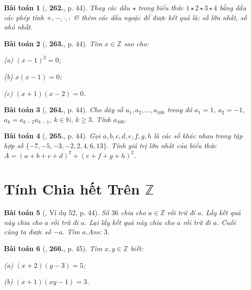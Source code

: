 \documentclass{article}
\numberwithin{equation}{section}
\newtheorem{baitoan}{Bài toán}
\begin{document}
\begin{baitoan}[\cite{Binh_Toan_6_tap_1}, \textbf{262.}, p. 44]
	Thay các dấu  $\star$ trong biểu thức $1\star2\star3\star4$ bằng dấu các phép tính $+,-,\cdot,:$ \& thêm các dấu ngoặc để được kết quả là: số lớn nhất, số nhỏ nhất.
\end{baitoan}

\begin{baitoan}[\cite{Binh_Toan_6_tap_1}, \textbf{263.}, p. 44]
	Tìm $x\in\mathbb{Z}$ sao cho:
	\begin{enumerate*}
		\item[(a)] $(x - 1)^2 = 0$;
		\item[(b)] $x(x - 1) = 0$;
		\item[(c)] $(x + 1)(x - 2) = 0$.
	\end{enumerate*}
\end{baitoan}

\begin{baitoan}[\cite{Binh_Toan_6_tap_1}, \textbf{264.}, p. 44]
	Cho dãy số $a_1,a_2,\ldots,a_{100}$ trong đó $a_1 = 1$, $a_2 = -1$, $a_k = a_{k-2}a_{k-1}$, $k\in\mathbb{N}$, $k\ge 3$. Tính $a_{100}$.
\end{baitoan}

\begin{baitoan}[\cite{Binh_Toan_6_tap_1}, \textbf{265.}, p. 44]
	Gọi $a,b,c,d,e,f,g,h$ là các số khác nhau trong tập hợp số $\{-7,-5,-3,-2,2,4,6,13\}$. Tính giá trị lớn nhất của biểu thức $A = (a + b + c + d)^2 + (e + f + g + h)^2$.
\end{baitoan}


\section{Tính Chia hết Trên $\mathbb{Z}$}

\begin{baitoan}[\cite{Binh_Toan_6_tap_1}, Ví dụ 52, p. 44]
	Số $36$ chia cho $a\in\mathbb{Z}$ rồi trừ đi $a$. Lấy kết quả này chia cho $a$ rồi trừ đi $a$. Lại lấy kết quả này chia cho $a$ rồi trừ đi $a$. Cuối cùng ta được số $-a$. Tìm $a$.\hfill\textsf{Ans:} $3$.
\end{baitoan}

\begin{baitoan}[\cite{Binh_Toan_6_tap_1}, \textbf{266.}, p. 45]
	Tìm $x,y\in\mathbb{Z}$ biết:
	\begin{enumerate*}
		\item[(a)] $(x + 2)(y - 3) = 5$;
		\item[(b)] $(x + 1)(xy - 1) = 3$.
	\end{enumerate*}
\end{baitoan}
\end{document}
